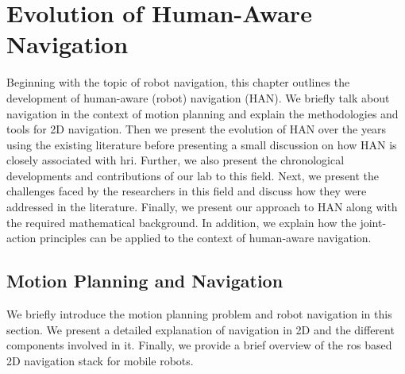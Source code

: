 \ifdefined{}
\else
\setcounter{chapter}{0}
\dominitoc
\faketableofcontents
\fi

\chapter{Evolution of Human-Aware Navigation}
\label{chap:1}
\minitoc


Beginning with the topic of robot navigation, this chapter outlines the development of human-aware (robot) navigation (HAN). We briefly talk about navigation in the context of motion planning and explain the methodologies and tools for 2D navigation. Then we present the evolution of HAN over the years using the existing literature before presenting a small discussion on how HAN is closely associated with \acrshort{hri}. Further, we also present the chronological developments and contributions of our lab to this field. Next, we present the challenges faced by the researchers in this field and discuss how they were addressed in the literature. Finally, we present our approach to HAN along with the required mathematical background. In addition, we explain how the joint-action principles can be applied to the context of human-aware navigation.

\section{Motion Planning and Navigation}

We briefly introduce the motion planning problem and robot navigation in this section. We present a detailed explanation of navigation in 2D and the different components involved in it. Finally, we provide a brief overview of the \acrshort{ros} based 2D navigation stack for mobile robots.

